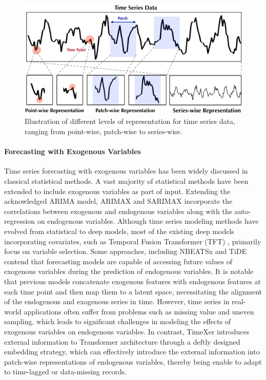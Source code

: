 \documentclass[nohyperref]{article}
\theoremstyle{plain}
\theoremstyle{definition}
\theoremstyle{remark}
\begin{document}
\begin{figure}[t]
    \centering
    \includegraphics[width=\linewidth]{fig/Representationv5.pdf}
    \vspace{-15pt}
    \caption{Illustration of different levels of representation for time series data, ranging from point-wise, patch-wise to series-wise.}
    \vspace{-10pt}
    \label{fig:Related-Work}
\end{figure}

\vspace{-5pt}
\paragraph{Forecasting with Exogenous Variables}
Time series forecasting with exogenous variables has been widely discussed in classical statistical methods.
A vast majority of statistical methods have been extended to include exogenous variables as part of input.
Extending the acknowledged ARIMA model, ARIMAX \cite{williams2001multivariate} and SARIMAX \cite{vagropoulos2016comparison} incorporate the correlations between exogenous and endogenous variables along with the auto-regression on endogenous variables. Although time series modeling methods have evolved from statistical to deep models, most of the existing deep models incorporating covariates, such as Temporal Fusion Transformer (TFT) \cite{lim2021temporal}, primarily focus on variable selection. Some approaches, including NBEATSx \cite{olivares2023neural} and TiDE \cite{das2023long} contend that forecasting models are capable of accessing future values of exogenous variables during the prediction of endogenous variables. It is notable that previous models concatenate exogenous features with endogenous features at each time point and then map them to a latent space, necessitating the alignment of the endogenous and exogenous series in time. However, time series in real-world applications often suffer from problems such as missing value and uneven sampling, which leads to significant challenges in modeling the effects of exogenous variables on endogenous variables. In contrast, TimeXer introduces external information to Transformer architecture through a deftly designed embedding strategy, which can effectively introduce the external information into patch-wise representations of endogenous variables, thereby being enable to adapt to time-lagged or data-missing records.
\end{document}
